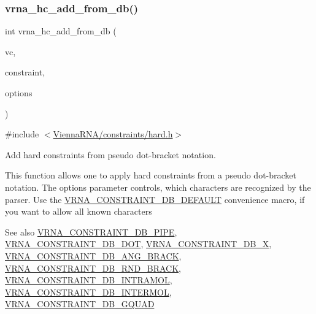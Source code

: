 \subsubsection{\texorpdfstring{vrna\_hc\_add\_from\_db()}{vrna\_hc\_add\_from\_db()}}
{\footnotesize\ttfamily int vrna\+\_\+hc\+\_\+add\+\_\+from\+\_\+db (\begin{DoxyParamCaption}\item[{\mbox{\hyperlink{group__fold__compound_ga1b0cef17fd40466cef5968eaeeff6166}{vrna\+\_\+fold\+\_\+compound\+\_\+t}} $\ast$}]{vc,  }\item[{const char $\ast$}]{constraint,  }\item[{unsigned int}]{options }\end{DoxyParamCaption})}



{\ttfamily \#include $<$\mbox{\hyperlink{hard_8h}{Vienna\+R\+N\+A/constraints/hard.\+h}}$>$}



Add hard constraints from pseudo dot-\/bracket notation. 

This function allows one to apply hard constraints from a pseudo dot-\/bracket notation. The {\ttfamily options} parameter controls, which characters are recognized by the parser. Use the \mbox{\hyperlink{group__hard__constraints_ga1c3864bdc92147a4d93de2b1b4356177}{V\+R\+N\+A\+\_\+\+C\+O\+N\+S\+T\+R\+A\+I\+N\+T\+\_\+\+D\+B\+\_\+\+D\+E\+F\+A\+U\+LT}} convenience macro, if you want to allow all known characters

\begin{DoxySeeAlso}{See also}
\mbox{\hyperlink{group__hard__constraints_ga13053547a2de5532b64b64d35e097ae1}{V\+R\+N\+A\+\_\+\+C\+O\+N\+S\+T\+R\+A\+I\+N\+T\+\_\+\+D\+B\+\_\+\+P\+I\+PE}}, \mbox{\hyperlink{group__hard__constraints_ga369bea82eae75fbe626f409fa425747e}{V\+R\+N\+A\+\_\+\+C\+O\+N\+S\+T\+R\+A\+I\+N\+T\+\_\+\+D\+B\+\_\+\+D\+OT}}, \mbox{\hyperlink{group__hard__constraints_ga7283bbe0f8954f7b030ecc3f2d1932b2}{V\+R\+N\+A\+\_\+\+C\+O\+N\+S\+T\+R\+A\+I\+N\+T\+\_\+\+D\+B\+\_\+X}}, \mbox{\hyperlink{hard_8h_ad54c1315a47d55653dcaa5de6e544b77}{V\+R\+N\+A\+\_\+\+C\+O\+N\+S\+T\+R\+A\+I\+N\+T\+\_\+\+D\+B\+\_\+\+A\+N\+G\+\_\+\+B\+R\+A\+CK}}, \mbox{\hyperlink{group__hard__constraints_gac17b034852c914bc5879954c65d7e74b}{V\+R\+N\+A\+\_\+\+C\+O\+N\+S\+T\+R\+A\+I\+N\+T\+\_\+\+D\+B\+\_\+\+R\+N\+D\+\_\+\+B\+R\+A\+CK}}, \mbox{\hyperlink{group__hard__constraints_ga5c17253f5a39d1d49b0fb11f5196982a}{V\+R\+N\+A\+\_\+\+C\+O\+N\+S\+T\+R\+A\+I\+N\+T\+\_\+\+D\+B\+\_\+\+I\+N\+T\+R\+A\+M\+OL}}, \mbox{\hyperlink{group__hard__constraints_ga31d0ebb9755ca8a4acafc14f00ca755d}{V\+R\+N\+A\+\_\+\+C\+O\+N\+S\+T\+R\+A\+I\+N\+T\+\_\+\+D\+B\+\_\+\+I\+N\+T\+E\+R\+M\+OL}}, \mbox{\hyperlink{group__hard__constraints_ga75cfab03cdc97c95b3ce8bb29f52b08e}{V\+R\+N\+A\+\_\+\+C\+O\+N\+S\+T\+R\+A\+I\+N\+T\+\_\+\+D\+B\+\_\+\+G\+Q\+U\+AD}}
\end{DoxySeeAlso}

